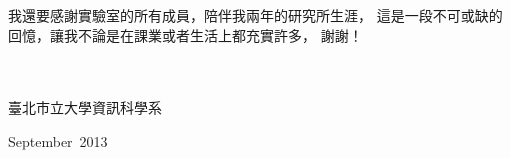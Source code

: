 \begin{acknowledgementsCH}

\setlength{\baselineskip}{1.5em}
我還要感謝實驗室的所有成員，陪伴我兩年的研究所生涯，%
這是一段不可或缺的回憶，讓我不論是在課業或者生活上都充實許多，%
謝謝！
\\
\\
\\


\raggedright{臺北市立大學資訊科學系}

\raggedright{September\ 2013}

\end{acknowledgementsCH}

